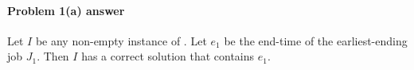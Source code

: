 

\paragraph{Problem 1(a) answer} 

\begin{lemma}
  Let $I$ be any non-empty instance of .
  Let $e_1$ be the end-time of the earliest-ending job $J_1$.
  Then $I$ has a correct solution that contains $e_1$.
\end{lemma}


